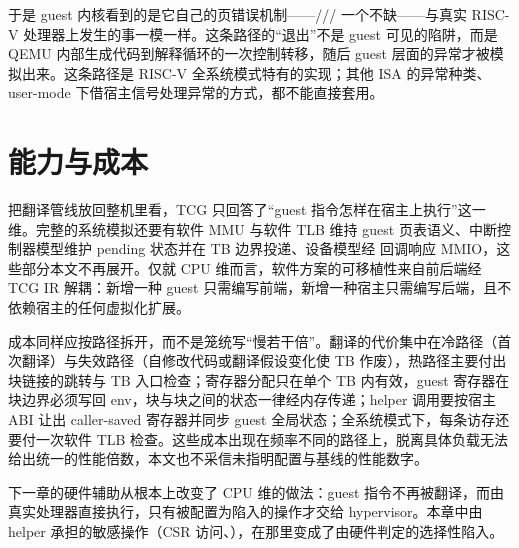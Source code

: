 于是 guest 内核看到的是它自己的页错误机制——/// 一个不缺——与真实 RISC-V 处理器上发生的事一模一样。这条路径的“退出”不是 guest 可见的陷阱，而是 QEMU 内部生成代码到解释循环的一次控制转移，随后 guest 层面的异常才被模拟出来。这条路径是 RISC-V 全系统模式特有的实现；其他 ISA 的异常种类、user-mode 下借宿主信号处理异常的方式，都不能直接套用\cite{source3}。

\section{能力与成本}\label{sec:software-cost}

把翻译管线放回整机里看，TCG 只回答了“guest 指令怎样在宿主上执行”这一维。完整的系统模拟还要有软件 MMU 与软件 TLB 维持 guest 页表语义、中断控制器模型维护 pending 状态并在 TB 边界投递、设备模型经  回调响应 MMIO，这些部分本文不再展开。仅就 CPU 维而言，软件方案的可移植性来自前后端经 TCG IR 解耦：新增一种 guest 只需编写前端，新增一种宿主只需编写后端，且不依赖宿主的任何虚拟化扩展\cite{source2,source3}。

成本同样应按路径拆开，而不是笼统写“慢若干倍”。翻译的代价集中在冷路径（首次翻译）与失效路径（自修改代码或翻译假设变化使 TB 作废），热路径主要付出块链接的跳转与 TB 入口检查；寄存器分配只在单个 TB 内有效，guest 寄存器在块边界必须写回 env，块与块之间的状态一律经内存传递；helper 调用要按宿主 ABI 让出 caller-saved 寄存器并同步 guest 全局状态；全系统模式下，每条访存还要付一次软件 TLB 检查。这些成本出现在频率不同的路径上，脱离具体负载无法给出统一的性能倍数，本文也不采信未指明配置与基线的性能数字。

下一章的硬件辅助从根本上改变了 CPU 维的做法：guest 指令不再被翻译，而由真实处理器直接执行，只有被配置为陷入的操作才交给 hypervisor。本章中由 helper 承担的敏感操作（CSR 访问、），在那里变成了由硬件判定的选择性陷入。
